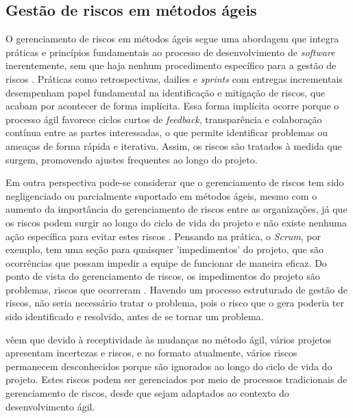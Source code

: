 \documentclass[
	12pt,
	openright,
	twoside,
	a4paper,
	english,
	brazil
	]{abntex2}
\begin{document}
\subsection{Gestão de riscos em métodos ágeis}

O gerenciamento de riscos em métodos ágeis segue uma abordagem que integra práticas e princípios fundamentais ao processo de desenvolvimento de \textit{software} inerentemente, sem que haja nenhum procedimento específico para a gestão de riscos \cite{Gold}. Práticas como retrospectivas, dailies e \textit{sprints} com entregas incrementais desempenham papel fundamental na identificação e mitigação de riscos, que acabam por acontecer de forma implícita. Essa forma implícita ocorre porque o processo ágil favorece ciclos curtos de \textit{feedback}, transparência e colaboração contínua entre as partes interessadas, o que permite identificar problemas ou ameaças de forma rápida e iterativa. Assim, os riscos são tratados à medida que surgem, promovendo ajustes frequentes ao longo do projeto.

Em outra perspectiva pode-se considerar que o gerenciamento de riscos tem sido negligenciado ou parcialmente suportado em métodos ágeis, mesmo com o aumento da importância do gerenciamento de riscos entre as organizações, já que os riscos podem surgir ao longo do ciclo de vida do projeto e não existe nenhuma ação específica para evitar estes riscos \cite{LopesSamueldeSouza2022ARMF}. Pensando na prática, o \textit{Scrum}, por exemplo, tem uma seção para quaisquer 'impedimentos' do projeto, que são ocorrências que possam impedir a equipe de funcionar de maneira eficaz. Do ponto de vista do gerenciamento de riscos, os impedimentos do projeto são problemas, riscos que ocorreram \cite{Gold}. Havendo um processo estruturado de gestão de riscos, não seria necessário tratar o problema, pois o risco que o gera poderia ter sido identificado e resolvido, antes de se tornar um problema.

 vêem que devido à receptividade às mudanças no método ágil, vários projetos apresentam incertezas e riscos, e no formato atualmente, vários riscos permanecem desconhecidos porque são ignorados ao longo do ciclo de vida do projeto. Estes riscos podem ser gerenciados por meio de processos tradicionais de gerenciamento de riscos, desde que sejam adaptados ao contexto do desenvolvimento ágil.
\end{document}

